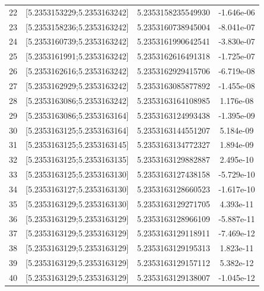 \documentclass[polish, 11pt, oneside]{article}   	%
\begin{document}
\begin{center}
\begin{tabular}{ |c|c|c|c| }
 22 & [5.2353153229;5.2353163242] & 5.2353158235549930 &   -1.646e-06 \\ 
 23 & [5.2353158236;5.2353163242] & 5.2353160738945004 &   -8.041e-07 \\ 
 24 & [5.2353160739;5.2353163242] & 5.2353161990642541 &   -3.830e-07 \\ 
 25 & [5.2353161991;5.2353163242] & 5.2353162616491318 &   -1.725e-07 \\ 
 26 & [5.2353162616;5.2353163242] & 5.2353162929415706 &   -6.719e-08 \\ 
 27 & [5.2353162929;5.2353163242] & 5.2353163085877892 &   -1.455e-08 \\ 
 28 & [5.2353163086;5.2353163242] & 5.2353163164108985 &    1.176e-08 \\ 
 29 & [5.2353163086;5.2353163164] & 5.2353163124993438 &   -1.395e-09 \\ 
 30 & [5.2353163125;5.2353163164] & 5.2353163144551207 &    5.184e-09 \\ 
 31 & [5.2353163125;5.2353163145] & 5.2353163134772327 &    1.894e-09 \\ 
 32 & [5.2353163125;5.2353163135] & 5.2353163129882887 &    2.495e-10 \\ 
 33 & [5.2353163125;5.2353163130] & 5.2353163127438158 &   -5.729e-10 \\ 
 34 & [5.2353163127;5.2353163130] & 5.2353163128660523 &   -1.617e-10 \\ 
 35 & [5.2353163129;5.2353163130] & 5.2353163129271705 &    4.393e-11 \\ 
 36 & [5.2353163129;5.2353163129] & 5.2353163128966109 &   -5.887e-11 \\ 
 37 & [5.2353163129;5.2353163129] & 5.2353163129118911 &   -7.469e-12 \\ 
 38 & [5.2353163129;5.2353163129] & 5.2353163129195313 &    1.823e-11 \\ 
 39 & [5.2353163129;5.2353163129] & 5.2353163129157112 &    5.382e-12 \\ 
 40 & [5.2353163129;5.2353163129] & 5.2353163129138007 &   -1.045e-12 \\ 
 \hline
\end{tabular}
\end{center}
\end{document}
